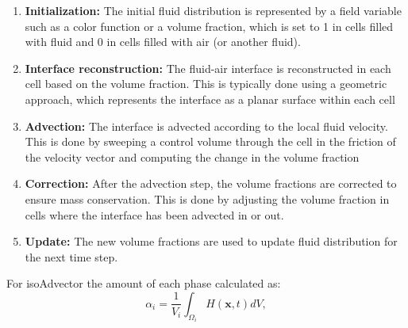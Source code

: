 \begin{enumerate}
\item \textbf {Initialization:} The initial fluid distribution is represented by a field variable such as a color function or a volume fraction, which is set to 1 in cells filled with fluid and 0 in cells filled with air (or another fluid).
\item \textbf {Interface reconstruction:} The fluid-air interface is reconstructed in each cell based on the volume fraction. This is typically done using a geometric approach, which represents the interface as a planar surface within each cell
\item \textbf {Advection:} The interface is advected according to the local fluid velocity. This is done by sweeping a control volume through the cell in the friction of the velocity vector and computing the change in the volume fraction
\item \textbf {Correction:} After the advection step, the volume fractions are corrected to ensure mass conservation. This is done by adjusting the volume fraction in cells where the interface has been advected in or out.
\item \textbf {Update:} The new volume fractions are used to update fluid distribution for the next time step.
\end{enumerate}
For isoAdvector the amount of each phase calculated as:
\begin{equation}
    \alpha_{i}=\frac{1}{V_{i}} \int_{\Omega_{i}} H(\boldsymbol{x}, t) d V,
\end{equation}
